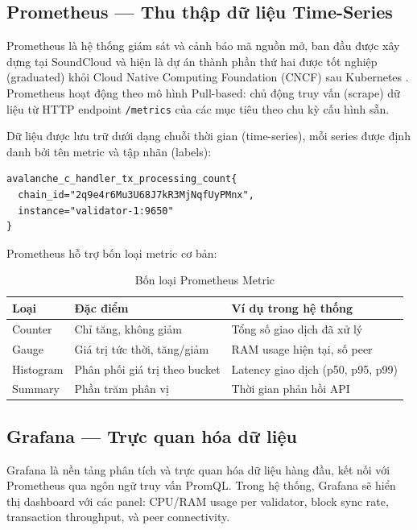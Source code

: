 \subsection{Prometheus --- Thu thập dữ liệu Time-Series}

Prometheus là hệ thống giám sát và cảnh báo mã nguồn mở, ban đầu được xây dựng tại SoundCloud và hiện là dự án thành phần thứ hai được tốt nghiệp (graduated) khỏi Cloud Native Computing Foundation (CNCF) sau Kubernetes \cite{prometheus2023docs}. Prometheus hoạt động theo mô hình Pull-based: chủ động truy vấn (scrape) dữ liệu từ HTTP endpoint \texttt{/metrics} của các mục tiêu theo chu kỳ cấu hình sẵn.

Dữ liệu được lưu trữ dưới dạng chuỗi thời gian (time-series), mỗi series được định danh bởi tên metric và tập nhãn (labels):

\begin{verbatim}
avalanche_c_handler_tx_processing_count{
  chain_id="2q9e4r6Mu3U68J7kR3MjNqfUyPMnx",
  instance="validator-1:9650"
}
\end{verbatim}

Prometheus hỗ trợ bốn loại metric cơ bản:

\begin{table}[H]
\centering
\caption{Bốn loại Prometheus Metric}
\label{tab:prometheus_metrics}
\begin{tabular}{|l|p{4cm}|p{5cm}|}
\hline
\textbf{Loại} & \textbf{Đặc điểm} & \textbf{Ví dụ trong hệ thống} \\ \hline
Counter & Chỉ tăng, không giảm & Tổng số giao dịch đã xử lý \\ \hline
Gauge & Giá trị tức thời, tăng/giảm & RAM usage hiện tại, số peer \\ \hline
Histogram & Phân phối giá trị theo bucket & Latency giao dịch (p50, p95, p99) \\ \hline
Summary & Phần trăm phân vị & Thời gian phản hồi API \\ \hline
\end{tabular}
\end{table}

\subsection{Grafana --- Trực quan hóa dữ liệu}

Grafana là nền tảng phân tích và trực quan hóa dữ liệu hàng đầu, kết nối với Prometheus qua ngôn ngữ truy vấn PromQL. Trong hệ thống, Grafana sẽ hiển thị dashboard với các panel: CPU/RAM usage per validator, block sync rate, transaction throughput, và peer connectivity.


